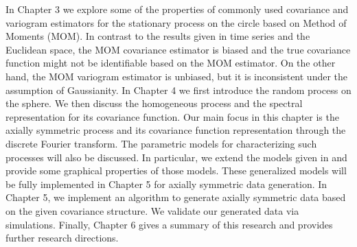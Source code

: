 In Chapter 3 we explore some of the properties of commonly used covariance and variogram estimators for the stationary process on the circle based on Method of Moments (MOM). In contrast to the results given in time series and the Euclidean space, the MOM covariance estimator is biased and the true covariance function might not be identifiable based on the MOM estimator. On the other hand, the MOM variogram estimator is unbiased, but it is inconsistent under the assumption of Gaussianity. In Chapter 4 we first introduce the random process on the sphere. We then discuss the homogeneous process and the spectral representation for its covariance function. Our main focus in this chapter is the axially symmetric process and its covariance function representation through the discrete Fourier transform. The parametric models for characterizing such processes will also be discussed. In particular, we extend the models given in \cite{Huang2012} and provide some graphical properties of those models. These generalized models will be fully implemented in Chapter 5 for axially symmetric data generation. In Chapter 5, we implement an algorithm to generate axially symmetric data based on the given covariance structure. We validate our generated data via simulations. Finally, Chapter 6 gives a summary of this research and provides further research directions.



